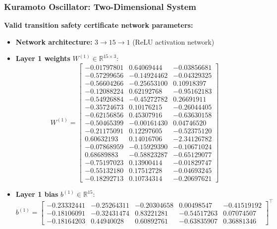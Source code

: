 	\subsubsection{Kuramoto Oscillator: Two-Dimensional System}
	\label{app:ko2d_neural}
	
	\textbf{Valid transition safety certificate network parameters:}
	
	\begin{itemize}
	    \item \textbf{Network architecture:} $3 \rightarrow 15 \rightarrow 1$ (ReLU activation network)
	    \item \textbf{Layer 1 weights} $W^{(1)} \in \mathbb{R}^{15 \times 3}$:
	    {\footnotesize
	    \[
	    W^{(1)} = \begin{bmatrix}
	    -0.01797801 &  0.64069444 & -0.03856681 \\
	    -0.57299656 & -0.14924462 & -0.04329325 \\
	    -0.56604266 & -0.25653100 &  0.10918397 \\
	    -0.12088224 &  0.62192768 & -0.95162183 \\
	    -0.54926884 & -0.45272782 &  0.26691911 \\
	    -0.35724673 &  0.10176215 & -0.26044405 \\
	    -0.62156856 &  0.45307916 & -0.63630158 \\
	    -0.50465399 & -0.00161430 &  0.04746520 \\
	    -0.21175091 &  0.12297605 & -0.52375120 \\
	     0.60632193 &  0.14016706 & -2.34126782 \\
	    -0.07868959 & -0.15929390 & -0.10671024 \\
	     0.68689883 & -0.58823287 & -0.65129077 \\
	    -0.75197023 &  0.13900414 & -0.01829747 \\
	    -0.55132180 &  0.17512728 & -0.04693245 \\
	    -0.18292713 &  0.10734314 & -0.20697621
	    \end{bmatrix}
	    \]}
	    
	    \item \textbf{Layer 1 bias} $b^{(1)} \in \mathbb{R}^{15}$:
	    {\scriptsize
	    \[
	    b^{(1)} = \begin{bmatrix}
	    -0.23332441 & -0.25264311 & -0.20304658 &  0.00498547 & -0.41519192 \\
	    -0.18106091 & -0.32431474 &  0.83221281 & -0.54517263 &  0.07074507 \\
	    -0.18164203 &  0.44940028 &  0.60892761 & -0.63835907 &  0.36881346
	    \end{bmatrix}^\top
	    \]}
	    

\end{itemize}
